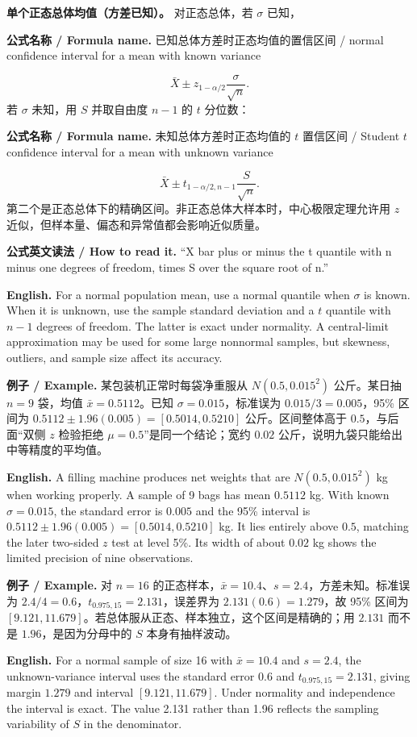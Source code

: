 \documentclass[UTF8,11pt,a4paper]{ctexart}
\newcommand{\EN}[1]{\par\noindent\textbf{English.} #1\par}
\newcommand{\READ}[1]{\par\noindent\textbf{公式英文读法 / How to read it.} #1\par}
\newcommand{\FORMULA}[2]{\par\noindent\textbf{公式名称 / Formula name.} #1 / #2\par}
\newcommand{\EX}[2]{\par\noindent\textbf{例子 / Example.} #1\par\EN{#2}}
\begin{document}
\noindent\textbf{单个正态总体均值（方差已知）。} 对正态总体，若 $\sigma$ 已知，
\FORMULA{已知总体方差时正态均值的置信区间}{normal confidence interval for a mean with known variance}
\[
\bar X\pm z_{1-\alpha/2}\frac{\sigma}{\sqrt n}.
\]
若 $\sigma$ 未知，用 $S$ 并取自由度 $n-1$ 的 $t$ 分位数：
\FORMULA{未知总体方差时正态均值的 $t$ 置信区间}{Student $t$ confidence interval for a mean with unknown variance}
\[
\bar X\pm t_{1-\alpha/2,n-1}\frac{S}{\sqrt n}.
\]
第二个是正态总体下的精确区间。非正态总体大样本时，中心极限定理允许用 $z$ 近似，但样本量、偏态和异常值都会影响近似质量。
\READ{“X bar plus or minus the t quantile with n minus one degrees of freedom, times S over the square root of n.”}
\EN{For a normal population mean, use a normal quantile when $\sigma$ is known. When it is unknown, use the sample standard deviation and a $t$ quantile with $n-1$ degrees of freedom. The latter is exact under normality. A central-limit approximation may be used for some large nonnormal samples, but skewness, outliers, and sample size affect its accuracy.}

\EX{某包装机正常时每袋净重服从 $N(0.5,0.015^2)$ 公斤。某日抽 $n=9$ 袋，均值 $\bar x=0.5112$。已知 $\sigma=0.015$，标准误为 $0.015/3=0.005$，95\% 区间为 $0.5112\pm1.96(0.005)=[0.5014,0.5210]$ 公斤。区间整体高于 $0.5$，与后面“双侧 $z$ 检验拒绝 $\mu=0.5$”是同一个结论；宽约 $0.02$ 公斤，说明九袋只能给出中等精度的平均值。}{A filling machine produces net weights that are $N(0.5,0.015^2)$ kg when working properly. A sample of 9 bags has mean $0.5112$ kg. With known $\sigma=0.015$, the standard error is $0.005$ and the 95\% interval is $0.5112\pm1.96(0.005)=[0.5014,0.5210]$ kg. It lies entirely above $0.5$, matching the later two-sided $z$ test at level 5\%. Its width of about $0.02$ kg shows the limited precision of nine observations.}

\EX{对 $n=16$ 的正态样本，$\bar x=10.4$、$s=2.4$，方差未知。标准误为 $2.4/4=0.6$，$t_{0.975,15}=2.131$，误差界为 $2.131(0.6)=1.279$，故 95\% 区间为 $[9.121,11.679]$。若总体服从正态、样本独立，这个区间是精确的；用 $2.131$ 而不是 $1.96$，是因为分母中的 $S$ 本身有抽样波动。}{For a normal sample of size 16 with $\bar x=10.4$ and $s=2.4$, the unknown-variance interval uses the standard error $0.6$ and $t_{0.975,15}=2.131$, giving margin $1.279$ and interval $[9.121,11.679]$. Under normality and independence the interval is exact. The value 2.131 rather than 1.96 reflects the sampling variability of $S$ in the denominator.}
\end{document}

